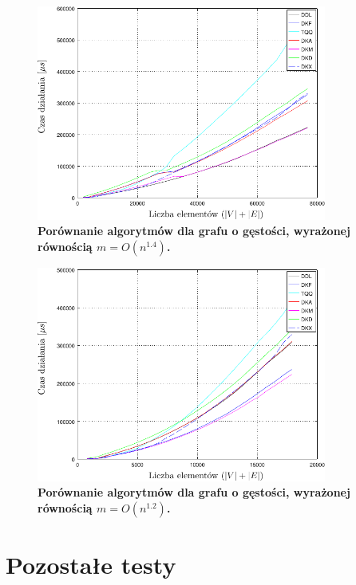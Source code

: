 \begin{figure}[!htbp]
	\centering
	\includegraphics[width=0.85\textwidth]{Chapter_IV/graph140_psfrag.pdf}
	\caption{\textbf{ Porównanie algorytmów dla grafu o gęstości, wyrażonej równością $ m = O \left( n^{1.4} \right)$.}}\label{fig:plotFullGraph_1.40}
\end{figure}

\begin{figure}[!htbp]
	\centering
	\includegraphics[width=0.85\textwidth]{Chapter_IV/graph120_psfrag.pdf}
	\caption{\textbf{ Porównanie algorytmów dla grafu o gęstości, wyrażonej równością $ m = O \left( n^{1.2} \right)$.}}\label{fig:plotFullGraph_1.20}
\end{figure}

\newpage

\section{Pozostałe testy}

